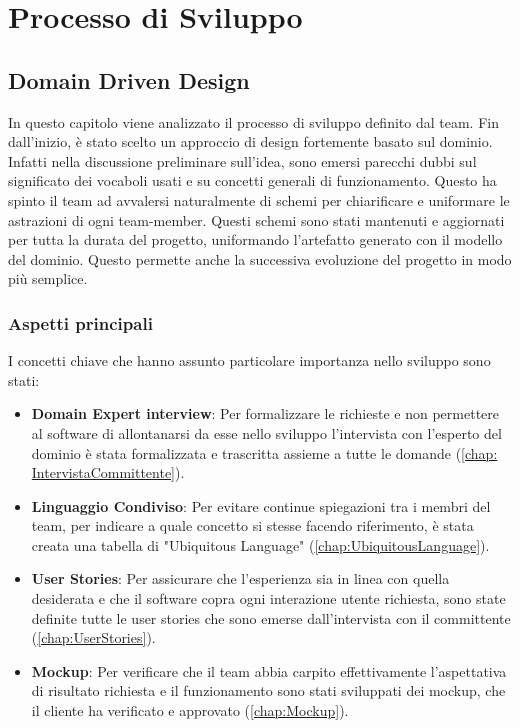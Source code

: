 \chapter{Processo di Sviluppo}

\section{Domain Driven Design}
In questo capitolo viene analizzato il processo di sviluppo definito dal team. Fin dall'inizio, è stato scelto un approccio di design fortemente basato sul dominio. Infatti nella discussione preliminare sull'idea, sono emersi parecchi dubbi sul significato dei vocaboli usati e su concetti generali di funzionamento. Questo ha spinto il team ad avvalersi naturalmente di schemi per chiarificare e uniformare le astrazioni di ogni team-member. Questi schemi sono stati mantenuti e aggiornati per tutta la durata del progetto, uniformando l'artefatto generato con il modello del dominio. Questo permette anche la successiva evoluzione del progetto in modo più semplice.
    \subsection{Aspetti principali}
    I concetti chiave che hanno assunto particolare importanza nello sviluppo sono stati:
    \begin{itemize}
        \item \textbf{Domain Expert interview}: Per formalizzare le richieste e non permettere al software di allontanarsi da esse nello sviluppo l'intervista con l'esperto del dominio è stata formalizzata e trascritta assieme a tutte le domande (\ref{chap: IntervistaCommittente}).
        \item \textbf{Linguaggio Condiviso}: Per evitare continue spiegazioni tra i membri del team, per indicare a quale concetto si stesse facendo riferimento, è stata creata una tabella di "Ubiquitous Language" (\ref{chap:UbiquitousLanguage}).
        \item \textbf{User Stories}: Per assicurare che l'esperienza sia in linea con quella desiderata e che il software copra ogni interazione utente richiesta, sono state definite tutte le user stories che sono emerse dall'intervista con il committente (\ref{chap:UserStories}).
        \item \textbf{Mockup}: Per verificare che il team abbia carpito effettivamente l'aspettativa di risultato richiesta e il funzionamento sono stati sviluppati dei mockup, che il cliente ha verificato e approvato (\ref{chap:Mockup}).
    \end{itemize}


